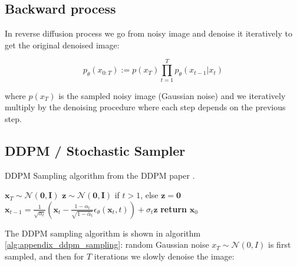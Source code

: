 \subsection*{Backward process}

In reverse diffusion process we go from noisy image and denoise it iteratively to get the original denoised image:

\[ p_\theta (x_{0:T}) := p(x_T) \prod_{t=1}^{T} p_\theta (x_{t-1} | x_t) \]

where $p(x_T)$ is the sampled noisy image (Gaussian noise) and we iteratively multiply by the denoising procedure where each step depends on the previous step.









\subsection{DDPM / Stochastic Sampler}





\begin{algorithm}
    \caption{DDPM Sampling algorithm from the DDPM paper \cite{ddpm}.}
    \label{alg:appendix_ddpm_sampling}
    \begin{algorithmic}[1]
        \State $\mathbf{x}_T \sim \mathcal{N}(\mathbf{0}, \mathbf{I})$
            \State $\mathbf{z} \sim \mathcal{N}(\mathbf{0}, \mathbf{I})$ if $t > 1$, else $\mathbf{z} = \mathbf{0}$
            \State $\mathbf{x}_{t-1} = \frac{1}{\sqrt{\alpha_t}} \left( \mathbf{x}_t - \frac{1 - \alpha_t}{\sqrt{1 - \bar{\alpha}_t}} {\epsilon}_{\theta} (\mathbf{x}_t, t) \right) + \sigma_t \mathbf{z}$
        \EndFor
        \State \textbf{return} $\mathbf{x}_0$
    \end{algorithmic}
\end{algorithm}






The DDPM sampling algorithm is shown in algorithm \ref{alg:appendix_ddpm_sampling}: random Gaussian noise $x_T \sim \mathcal{N} (0, I)$ is first sampled, and then for $T$ iterations we slowly denoise the image:

